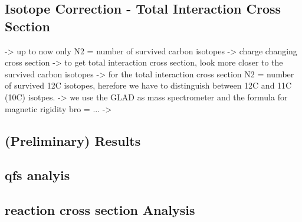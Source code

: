 \subsection{Isotope Correction - Total Interaction Cross Section}
-> up to now only N2 = number of survived carbon isotopes -> charge changing cross section
-> to get total interaction cross section, look more closer to the survived carbon isotopes 
-> for the total interaction cross section N2 = number of survived 12C isotopes, herefore we have to distinguish between 12C and 11C (10C) isotpes.
-> we use the GLAD as mass spectrometer and the formula for magnetic rigidity bro = ... -> 

\subsection{(Preliminary) Results}
\subsection{qfs analyis}
\subsection{reaction cross section Analysis}

